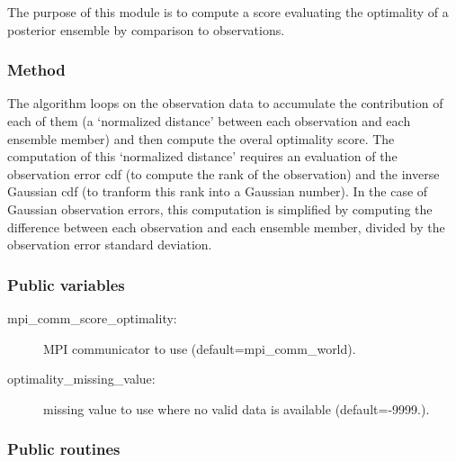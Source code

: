 \documentclass[11pt]{article}
\begin{document}
The purpose of this module is to compute a score
evaluating the optimality of a posterior ensemble
by comparison to observations.

\subsubsection*{Method}

The algorithm loops on the observation data
to accumulate the contribution of each of them
(a `normalized distance' between each observation and each ensemble member)
and then compute the overal optimality score.
The computation of this `normalized distance' requires an evaluation
of the observation error cdf (to compute the rank of the observation)
and the inverse Gaussian cdf (to tranform this rank into a Gaussian number).
In the case of Gaussian observation errors, this computation is simplified
by computing the difference between each observation and each ensemble member,
divided by the observation error standard deviation.

\subsubsection*{Public variables}

\begin{description}
\item[mpi\_comm\_score\_optimality:] MPI communicator to use (default=mpi\_comm\_world).
\item[optimality\_missing\_value:] missing value to use where no valid data is available (default=-9999.).
\end{description}

\subsubsection*{Public routines}
\end{document}
